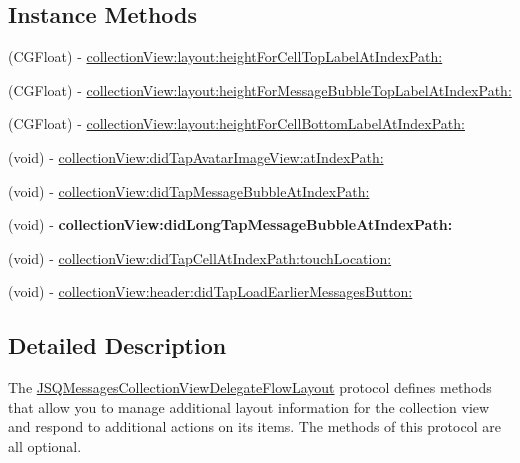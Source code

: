 \subsection*{Instance Methods}
\begin{DoxyCompactItemize}
\item 
(C\+G\+Float) -\/ \hyperlink{protocol_j_s_q_messages_collection_view_delegate_flow_layout-p_ae65c3c8bd637ce6c98b676cd9be68b4b}{collection\+View\+:layout\+:height\+For\+Cell\+Top\+Label\+At\+Index\+Path\+:}
\item 
(C\+G\+Float) -\/ \hyperlink{protocol_j_s_q_messages_collection_view_delegate_flow_layout-p_a44f783c4f7116efb4c1e505621ccc685}{collection\+View\+:layout\+:height\+For\+Message\+Bubble\+Top\+Label\+At\+Index\+Path\+:}
\item 
(C\+G\+Float) -\/ \hyperlink{protocol_j_s_q_messages_collection_view_delegate_flow_layout-p_a60a3fddb6f9308e970beb920b34c1bd2}{collection\+View\+:layout\+:height\+For\+Cell\+Bottom\+Label\+At\+Index\+Path\+:}
\item 
(void) -\/ \hyperlink{protocol_j_s_q_messages_collection_view_delegate_flow_layout-p_a3c626bde62e4d33258dcb33d9c77abb7}{collection\+View\+:did\+Tap\+Avatar\+Image\+View\+:at\+Index\+Path\+:}
\item 
(void) -\/ \hyperlink{protocol_j_s_q_messages_collection_view_delegate_flow_layout-p_ac961f1b3942c4a0ac6223b3b50f724f9}{collection\+View\+:did\+Tap\+Message\+Bubble\+At\+Index\+Path\+:}
\item 
\hypertarget{protocol_j_s_q_messages_collection_view_delegate_flow_layout-p_a2ee5eb03db7f8704942a67feab0c464d}{}(void) -\/ {\bfseries collection\+View\+:did\+Long\+Tap\+Message\+Bubble\+At\+Index\+Path\+:}\label{protocol_j_s_q_messages_collection_view_delegate_flow_layout-p_a2ee5eb03db7f8704942a67feab0c464d}

\item 
(void) -\/ \hyperlink{protocol_j_s_q_messages_collection_view_delegate_flow_layout-p_a2506b06e4d3f87897c5d0eb380070c80}{collection\+View\+:did\+Tap\+Cell\+At\+Index\+Path\+:touch\+Location\+:}
\item 
(void) -\/ \hyperlink{protocol_j_s_q_messages_collection_view_delegate_flow_layout-p_ab8f91bf1f17289f0e2e0116f14490d68}{collection\+View\+:header\+:did\+Tap\+Load\+Earlier\+Messages\+Button\+:}
\end{DoxyCompactItemize}


\subsection{Detailed Description}
The {\ttfamily \hyperlink{protocol_j_s_q_messages_collection_view_delegate_flow_layout-p}{J\+S\+Q\+Messages\+Collection\+View\+Delegate\+Flow\+Layout}} protocol defines methods that allow you to manage additional layout information for the collection view and respond to additional actions on its items. The methods of this protocol are all optional. 

